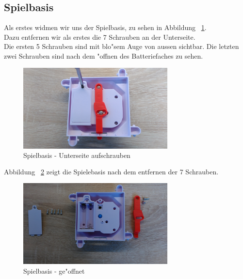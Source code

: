 \subsection{Spielbasis}


Als erstes widmen wir uns der Spielbasis, zu sehen in Abbildung ~\ref{fig2}. \\
Dazu entfernen wir als erstes die 7 Schrauben an der Unterseite. \\
Die ersten 5 Schrauben sind mit blo"sem Auge von aussen sichtbar. Die letzten zwei Schrauben sind nach dem "offnen des Batteriefaches zu sehen.  

\vspace{1cm}
\begin{figure}[!ht]
	\centering
  	\includegraphics[width=0.7\textwidth]{pictures/loolou_002.jpg}
	\caption{Spielbasis - Unterseite aufschrauben}
	\label{fig2}
\end{figure}
\vspace{0.5cm}

Abbildung ~\ref{fig3} zeigt die Spielebasis nach dem entfernen der 7 Schrauben. 

\vspace{1cm}
\begin{figure}[!ht]
	\centering
  	\includegraphics[width=0.7\textwidth]{pictures/loolou_003.jpg}
	\caption{Spielbasis - ge"offnet}
	\label{fig3}
\end{figure}
\vspace{0.5cm}

